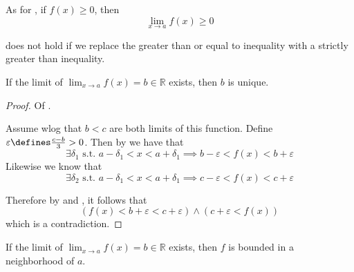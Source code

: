 \begin{rem}
    As for , if $f(x) \geq 0$,
    then
    \begin{equation*}
        \lim_{x \to a}f(x) \geq 0
    \end{equation*}
\end{rem}

\begin{rem}
     does not hold if we replace the greater
    than or equal to inequality with a strictly greater than inequality.
\end{rem}

\begin{thm}\label{thm-unique-limit}
    If the limit of $\displaystyle\lim_{x\to a}f(x)=b\in\mathbb{R}$ exists, then $b$ is unique.
\end{thm}

\begin{proof}
    Of .
    \begin{flushleft}
        Assume \gls{wlog} that $b<c$ are both limits of this function. Define
        $\varepsilon\defines\tfrac{c-b}{3}>0$. Then by 
         we have that
        \begin{equation}\label{eq-unique-limit:1}
            \exists\delta_1\text{ s.t. }a-\delta_1<x<a+\delta_1 \implies b-\varepsilon<f(x)<b+\varepsilon
        \end{equation}
        Likewise we know that
        \begin{equation}\label{eq-unique-limit:2}
            \exists\delta_2\text{ s.t. }a-\delta_1<x<a+\delta_1 \implies c-\varepsilon<f(x)<c+\varepsilon
        \end{equation}
    \end{flushleft}
    Therefore by  and ,
    it follows that
    \begin{equation*}
        \left(f(x)<b+\varepsilon<c+\varepsilon\right)\land\left(c+\varepsilon<f(x)\right)
    \end{equation*}
    which is a contradiction. 
\end{proof}

\begin{thm}\label{def-limit-is-bounded}
    If the limit of $\displaystyle\lim_{x\to a}f(x)=b\in\mathbb{R}$ exists, then
    $f$ is bounded in a neighborhood of $a$.
\end{thm}


